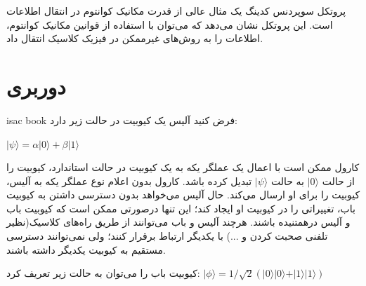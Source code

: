 \documentclass{book}
\begin{document}
پروتکل سوپردنس کدینگ یک مثال عالی از قدرت مکانیک کوانتوم در انتقال اطلاعات است. این پروتکل نشان می‌دهد که می‌توان با استفاده از قوانین مکانیک کوانتوم، اطلاعات را به روش‌های غیرممکن در فیزیک کلاسیک انتقال داد.
\newpage
\section{دوربری}
isac book
فرض کنید آلیس یک کیوبیت در حالت زیر دارد:
\begin{center}
$\vert \psi \rangle = \alpha\vert 0 \rangle + \beta\vert 1 \rangle $\\	
\end{center}

	کارول ممکن است با اعمال یک عملگر یکه‌ به یک کیوبیت در حالت استاندارد، کیوبیت را از حالت $\vert0\rangle$ به حالت $\vert\psi\rangle$  تبدیل کرده باشد. کارول بدون اعلام نوع عملگر یکه به آلیس،‌ کیوبیت را برای او ارسال می‌کند. 
	حال آلیس می‌خواهد بدون دسترسی داشتن به کیوبیت باب، تغییراتی را در کیوبیت او ایجاد کند؛ این تنها درصورتی ممکن است که کیوبیت باب و آلیس درهمتنیده باشند. هرچند آلیس و باب می‌توانند از طریق راه‌های کلاسیک(نظیر تلفنی صحبت کردن و ...) با یکدیگر ارتباط برقرار کنند؛ ولی نمی‌توانند دسترسی مستقیم به کیوبیت یکدیگر داشته باشند. 
	
	کیوبیت باب را می‌توان به حالت زیر تعریف کرد:
$\vert\phi\rangle = 1/\sqrt{2}(\vert0\rangle \vert0\rangle + \vert1\rangle\vert1\rangle)$ 
	
\end{document}
